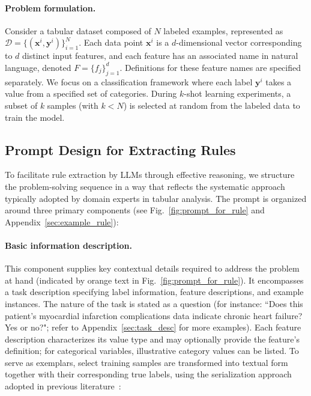 \vspace*{-0.12in}
\paragraph{Problem formulation.} Consider a tabular dataset composed of $N$ labeled examples, represented as $\mathcal{D} = \{(\mathbf{x}^i, \mathbf{y}^i)\}_{i=1}^{N}$. Each data point $\mathbf{x}^i$ is a $d$-dimensional vector corresponding to $d$ distinct input features, and each feature has an associated name in natural language, denoted $F = \{f_j\}_{j=1}^{d}$. Definitions for these feature names are specified separately. We focus on a classification framework where each label $\mathbf{y}^i$ takes a value from a specified set of categories. During $k$-shot learning experiments, a subset of $k$ samples (with $k < N$) is selected at random from the labeled data to train the model.

\subsection{Prompt Design for Extracting Rules}
\label{Sec:prompt_design}
To facilitate rule extraction by LLMs through effective reasoning, we structure the problem-solving sequence in a way that reflects the systematic approach typically adopted by domain experts in tabular analysis. The prompt is organized around three primary components (see Fig.~\ref{fig:prompt_for_rule} and Appendix~\ref{sec:example_rule}):

\vspace*{-0.12in}
\paragraph{Basic information description.} This component supplies key contextual details required to address the problem at hand (indicated by orange text in Fig.~\ref{fig:prompt_for_rule}). It encompasses a task description specifying label information, feature descriptions, and example instances. The nature of the task is stated as a question (for instance: ``Does this patient's myocardial infarction complications data indicate chronic heart failure? Yes or no?"; refer to Appendix~\ref{sec:task_desc} for more examples). Each feature description characterizes its value type and may optionally provide the feature's definition; for categorical variables, illustrative category values can be listed. To serve as exemplars, select training samples are transformed into textual form together with their corresponding true labels, using the serialization approach adopted in previous literature~\cite{dinh2022lift,hegselmann2023tabllm}:

